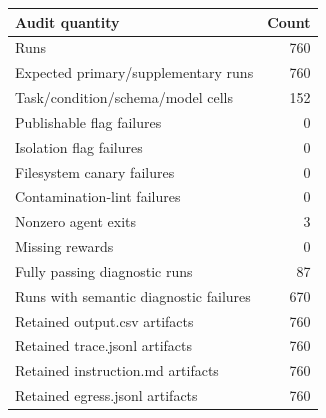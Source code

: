\begin{tabular}{lr}
\toprule
Audit quantity & Count \\
\midrule
Runs & 760 \\
Expected primary/supplementary runs & 760 \\
Task/condition/schema/model cells & 152 \\
Publishable flag failures & 0 \\
Isolation flag failures & 0 \\
Filesystem canary failures & 0 \\
Contamination-lint failures & 0 \\
Nonzero agent exits & 3 \\
Missing rewards & 0 \\
Fully passing diagnostic runs & 87 \\
Runs with semantic diagnostic failures & 670 \\
Retained output.csv artifacts & 760 \\
Retained trace.jsonl artifacts & 760 \\
Retained instruction.md artifacts & 760 \\
Retained egress.jsonl artifacts & 760 \\
\bottomrule
\end{tabular}
